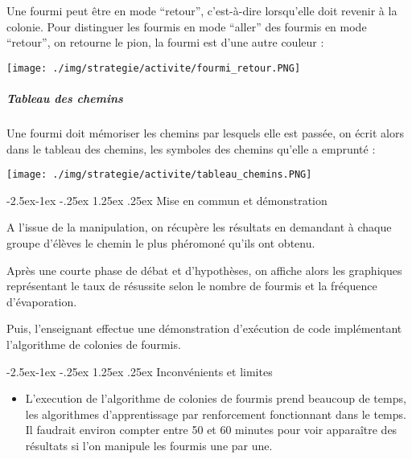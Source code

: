 \documentclass[
12pt,
french,
]{article}
\makeatletter
\providecommand{\tightlist}{%
\setlength{\itemsep}{0pt}\setlength{\parskip}{0pt}}
\let\origfigure\figure
\let\endorigfigure\endfigure
\renewenvironment{figure}[1][2] {
  \expandafter\origfigure\expandafter[H]
} {
  \endorigfigure
}
\renewcommand\paragraph{\@startsection{paragraph}{4}{\z@}%
        {-2.5ex\@plus -1ex \@minus -.25ex}%
        {1.25ex \@plus .25ex}%
        {\normalfont\normalsize\bfseries}}
\makeatother
\begin{document}
Une fourmi peut être en mode ``retour'', c'est-à-dire lorsqu'elle doit
revenir à la colonie. Pour distinguer les fourmis en mode ``aller'' des
fourmis en mode ``retour'', on retourne le pion, la fourmi est d'une
autre couleur :

\begin{figure}
\centering
\texttt{[image: ./img/strategie/activite/fourmi\_retour.PNG]}
\caption{Fourmi n°3 de l'élève B en mode retour}
\end{figure}

\hypertarget{tableau-des-chemins}{%
\subparagraph{Tableau des chemins}\label{tableau-des-chemins}}

Une fourmi doit mémoriser les chemins par lesquels elle est passée, on
écrit alors dans le tableau des chemins, les symboles des chemins
qu'elle a emprunté :

\begin{figure}
\centering
\texttt{[image: ./img/strategie/activite/tableau\_chemins.PNG]}
\caption{Tableau des chemins}
\end{figure}

\hypertarget{mise-en-commun-et-duxe9monstration}{%
\paragraph{Mise en commun et
démonstration}\label{mise-en-commun-et-duxe9monstration}}

A l'issue de la manipulation, on récupère les résultats en demandant à
chaque groupe d'élèves le chemin le plus phéromoné qu'ils ont obtenu.

Après une courte phase de débat et d'hypothèses, on affiche alors les
graphiques représentant le taux de résussite selon le nombre de fourmis
et la fréquence d'évaporation.

Puis, l'enseignant effectue une démonstration d'exécution de code
implémentant l'algorithme de colonies de fourmis.

\hypertarget{inconvuxe9nients-et-limites}{%
\paragraph{Inconvénients et limites}\label{inconvuxe9nients-et-limites}}

\begin{itemize}
\tightlist
\item
  L'execution de l'algorithme de colonies de fourmis prend beaucoup de
  temps, les algorithmes d'apprentissage par renforcement fonctionnant
  dans le temps. Il faudrait environ compter entre 50 et 60 minutes pour
  voir apparaître des résultats si l'on manipule les fourmis une par
  une.
\end{itemize}
\end{document}
